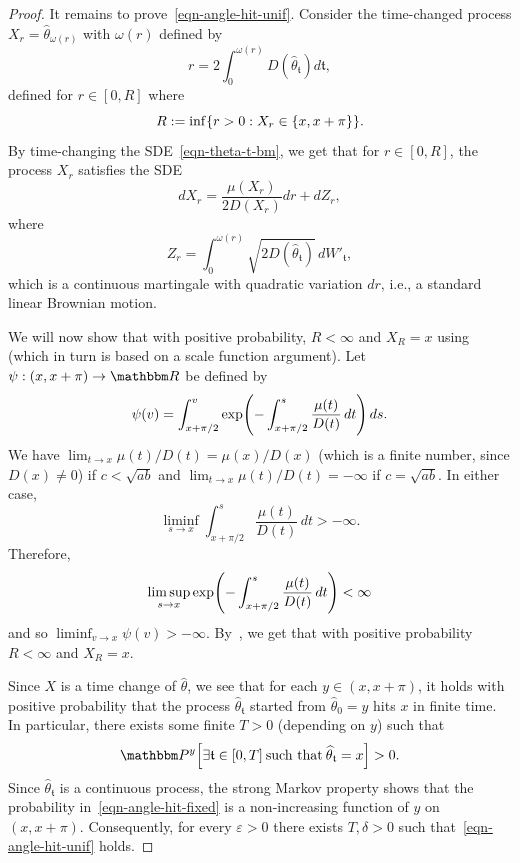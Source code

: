 \documentclass[11pt]{article}
\theoremstyle{plain}
\theoremstyle{definition}
\numberwithin{equation}{section}
\newcommand{\eqb}{\begin{equation}}
\newcommand{\eqe}{\end{equation}}
\newcommand{\eqbn}{\begin{equation*}}
\newcommand{\eqen}{\end{equation*}}
\newcommand{\BB}{\mathbbm}
\newcommand{\ep}{\varepsilon}
\newcommand{\wh}{\widehat}
\newcommand{\tz}{{\mathfrak t}}
\let\originalleft\left
\let\originalright\right
\renewcommand{\left}{\mathopen{}\mathclose\bgroup\originalleft}
\renewcommand{\right}{\aftergroup\egroup\originalright}
\begin{document}
\begin{proof}
It remains to prove~\eqref{eqn-angle-hit-unif}. Consider the time-changed process $X_r  = \wh{\theta}_{\omega(r)}$ with $\omega(r)$ defined by 
\eqb \label{eqn-omega-time}
r = 2 \int_0^{\omega(r)} D(\wh{\theta}_{\tz} ) d\tz, 
\eqe 
defined for $r\in [0,R]$ where 
\eqbn
R := \inf\left\{r > 0 : X_r \in \{x,x+\pi\} \right\}  .
\eqen  
By time-changing the SDE~\eqref{eqn-theta-t-bm}, we get that for $r \in [0,R]$, the process $X_r$ satisfies the SDE
\eqb \label{eqn-omega-sde}
dX_r = \frac{\mu(X_r)}{2D(X_r)} dr + dZ_r,
\eqe
where 
\eqbn
Z_r =   \int_0^{\omega(r)}   \sqrt{2 D(\wh\theta_\tz)}  \,dW'_{\tz} ,
\eqen
which is a continuous martingale with quadratic variation $dr$, i.e., a standard linear Brownian motion. 

We will now show that with positive probability, $R < \infty$ and $X_R = x$ using~\cite[Lemma 1.24]{lawler-book} (which in turn is based on a scale function argument). 
Let $\psi : (x,x+\pi) \to \BB R$ be defined by 
\eqbn
\psi(v) = \int_{x+\pi/2}^v \exp\left( - \int_{x+\pi/2}^s \frac{\mu(t)}{ D(t)} \,dt  \right) \,ds .
\eqen 
We have $\lim_{t\to x} \mu(t) /   D(t) = \mu(x) / D(x)$ (which is a finite number, since $D(x)\not=0$) if $c < \sqrt{a b}$ and $\lim_{t\to x} \mu(t) /   D(t) = -\infty$ if $c =\sqrt{a b}$. In either case,
\eqbn
\liminf_{s \to x} \int_{x+\pi/2}^s \frac{\mu(t)}{ D(t)} \,dt > -\infty .
\eqen
Therefore,
\eqbn
\limsup_{s \to x} \exp\left( - \int_{x+\pi/2}^s \frac{\mu(t)}{ D(t)} \,dt  \right) < \infty 
\eqen
and so $\liminf_{v \to x} \psi(v) > -\infty$. By~\cite[Lemma 1.24]{lawler-book}, we get that with positive probability $R < \infty$ and $X_R  = x$.  

Since $X$ is a time change of $\wh\theta$, we see that for each $y\in (x,x+\pi)$, it holds with positive probability that the process $\wh\theta_{\tz}$ started from $\wh\theta_0 = y$ hits $x$ in finite time. In particular, there exists some finite $T >0$ (depending on $y$) such that 
\eqb \label{eqn-angle-hit-fixed}
\BB P^y\left[  \exists \tz \in [0,T] \: \text{such that} \: \wh\theta_{\tz} = x \right]  > 0 .
\eqe  
Since $\wh\theta_{\tz}$ is a continuous process, the strong Markov property shows that the probability in~\eqref{eqn-angle-hit-fixed} is a non-increasing function of $y$ on $(x,x+\pi)$. Consequently, for every $\ep > 0$ there exists $T , \delta >0$ such that~\eqref{eqn-angle-hit-unif} holds.
\end{proof}

\end{document}

